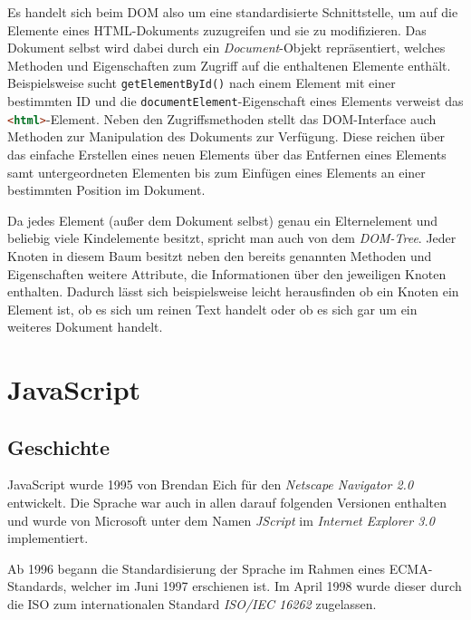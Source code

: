 Es handelt sich beim DOM also um eine standardisierte Schnittstelle, um auf die Elemente eines
HTML-Dokuments zuzugreifen und sie zu modifizieren. Das Dokument selbst wird dabei durch ein
\emph{Document}-Objekt repräsentiert, welches Methoden und Eigenschaften zum Zugriff auf die
enthaltenen Elemente enthält. Beispielsweise sucht \lstinline{getElementById()} nach
einem Element mit einer bestimmten ID und die \lstinline{documentElement}-Eigenschaft eines Elements
verweist das \lstinline[language=HTML]{<html>}-Element. Neben den Zugriffsmethoden stellt das
DOM-Interface auch Methoden zur Manipulation des Dokuments zur Verfügung. Diese reichen über das
einfache Erstellen eines neuen Elements über das Entfernen eines Elements samt untergeordneten
Elementen bis zum Einfügen eines Elements an einer bestimmten Position im Dokument.

Da jedes Element (außer dem Dokument selbst) genau ein Elternelement und beliebig viele Kindelemente
besitzt, spricht man auch von dem \emph{DOM-Tree}. Jeder Knoten in diesem Baum besitzt neben den
bereits genannten Methoden und Eigenschaften weitere Attribute, die Informationen über den
jeweiligen Knoten enthalten. Dadurch lässt sich beispielsweise leicht herausfinden ob ein Knoten ein
Element ist, ob es sich um reinen Text handelt oder ob es sich gar um ein weiteres Dokument handelt.







\section{JavaScript}

\subsection{Geschichte}

JavaScript wurde 1995 von Brendan Eich für den \emph{Netscape Navigator 2.0} entwickelt. Die Sprache
war auch in allen darauf folgenden Versionen enthalten und wurde von Microsoft unter dem Namen
\emph{JScript} im \emph{Internet Explorer 3.0} implementiert.

Ab 1996 begann die Standardisierung der Sprache im Rahmen eines ECMA-Standards, welcher im Juni 1997
erschienen ist. Im April 1998 wurde dieser durch die ISO zum internationalen Standard \emph{ISO/IEC
16262} zugelassen.

